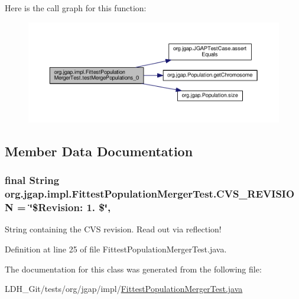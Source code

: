 Here is the call graph for this function\-:
\nopagebreak
\begin{figure}[H]
\begin{center}
\leavevmode
\includegraphics[width=350pt]{classorg_1_1jgap_1_1impl_1_1_fittest_population_merger_test_adda6de942fdd1f02b8e6ce9937c0de40_cgraph}
\end{center}
\end{figure}




\subsection{Member Data Documentation}
\hypertarget{classorg_1_1jgap_1_1impl_1_1_fittest_population_merger_test_a3a6a213902b90a3f97de33dafba46be8}{
\subsubsection[{C\-V\-S\-\_\-\-R\-E\-V\-I\-S\-I\-O\-N}]{\setlength{\rightskip}{0pt plus 5cm}final String org.\-jgap.\-impl.\-Fittest\-Population\-Merger\-Test.\-C\-V\-S\-\_\-\-R\-E\-V\-I\-S\-I\-O\-N = \char`\"{}\$Revision\-: 1. \$\char`\"{}\hspace{0.3cm}{\ttfamily [static]}, {\ttfamily [private]}}}\label{classorg_1_1jgap_1_1impl_1_1_fittest_population_merger_test_a3a6a213902b90a3f97de33dafba46be8}
String containing the C\-V\-S revision. Read out via reflection! 

Definition at line 25 of file Fittest\-Population\-Merger\-Test.\-java.



The documentation for this class was generated from the following file\-:\begin{DoxyCompactItemize}
\item 
L\-D\-H\-\_\-\-Git/tests/org/jgap/impl/\hyperlink{_fittest_population_merger_test_8java}{Fittest\-Population\-Merger\-Test.\-java}\end{DoxyCompactItemize}
